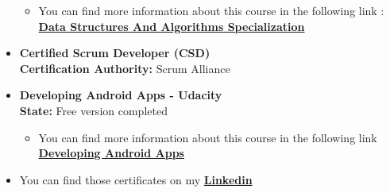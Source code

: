\documentclass[a4paper,10pt]{article} %
\begin{document}
\begin{itemize}
\begin{itemize}
\fi
\item You can find more information about this course in the following link : \href{https://www.coursera.org/specializations/data-structures-algorithms}{\textbf{Data Structures And Algorithms Specialization}}\\
\end{itemize}
\item \textbf{Certified Scrum Developer (CSD)}\\
\textbf{Certification Authority:} Scrum Alliance\\
\item \textbf{Developing Android Apps - Udacity}\\
\textbf{State:} Free version completed
\begin{itemize}
\item You can find more information about this course in the following link \href{https://www.udacity.com/course/developing-android-apps--ud853}{\textbf{Developing Android Apps}}
\end{itemize}
\item You can find those certificates on my \href{https://www.linkedin.com/in/esteban-foronda-sierra-217446b2}{\textbf{Linkedin}}\\
\end{itemize}



\newpage
\end{document}
